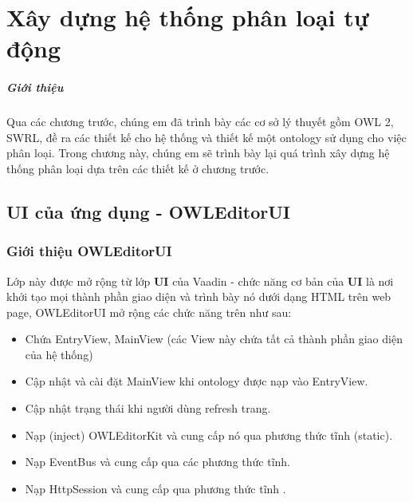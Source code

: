 \chapter{Xây dựng hệ thống phân loại tự động}
\paragraph{Giới thiệu} Qua các chương trước, chúng em đã trình bày các cơ sở lý thuyết gồm OWL 2, SWRL, đề ra các thiết kế cho hệ thống và thiết kế một ontology sử dụng cho việc phân loại. Trong chương này, chúng em sẽ trình bày lại quá trình xây dựng hệ thống phân loại dựa trên các thiết kế ở chương trước.
\section{UI của ứng dụng - OWLEditorUI}
\subsection{Giới thiệu OWLEditorUI}
Lớp này được mở rộng từ lớp \textbf{UI} của Vaadin - chức năng cơ bản của \textbf{UI} là nơi khởi tạo mọi thành phần giao diện và trình bày nó dưới dạng HTML trên web page, OWLEditorUI mở rộng các chức năng trên như sau:
\begin{itemize}
\item Chứa EntryView, MainView (các View này chứa tất cả thành phần giao diện của hệ thống)
\item Cập nhật và cài đặt MainView khi ontology được nạp vào EntryView.
\item Cập nhật trạng thái khi người dùng refresh trang.
\item Nạp (inject) OWLEditorKit và cung cấp nó qua phương thức tĩnh (static).
\item Nạp EventBus và cung cấp qua các phương thức tĩnh.
\item Nạp HttpSession và cung cấp qua phương thức tĩnh .
\end{itemize}
